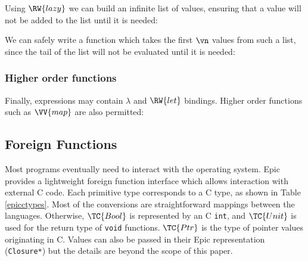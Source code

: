 \noindent
Using $\RW{lazy}$ we can build an infinite list of values, ensuring
that a value will not be added to the list until it is needed:


We can safely write a function which takes the first $\vn$ values from
such a list, since the tail of the list will not be evaluated until it
is needed:


\subsubsection*{Higher order functions}

Finally, expressions may contain $\lambda$ and $\RW{let}$
bindings. Higher order functions such as $\VV{map}$ are also permitted:


\subsection{Foreign Functions}

Most programs eventually need to interact with the operating
system. Epic provides a lightweight foreign function interface which
allows interaction with external C code. Each primitive type
corresponds to a C type, as shown in Table \ref{epicctypes}.  Most of
the conversions are straightforward mappings between the
languages. Otherwise, $\TC{Bool}$ is represented by an C \texttt{int},
and $\TC{Unit}$ is used for the return type of \texttt{void}
functions. $\TC{Ptr}$ is the type of pointer values originating in
C. Values can also be passed in their Epic representation
(\texttt{Closure*}) but the details are beyond the scope of this paper.

